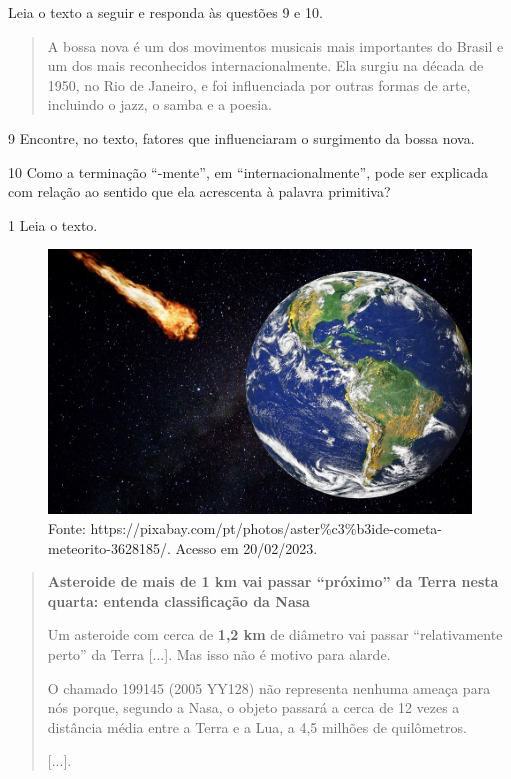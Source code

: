 
Leia o texto a seguir e responda às questões 9 e 10.

\begin{quote}
A bossa nova é um dos movimentos musicais mais importantes do Brasil e
um dos mais reconhecidos internacionalmente. Ela surgiu na década de
1950, no Rio de Janeiro, e foi influenciada por outras formas de arte,
incluindo o jazz, o samba e a poesia.
\end{quote}

\num{9} Encontre, no texto, fatores que influenciaram o surgimento da bossa nova.



\num{10} Como a terminação ``-mente'', em ``internacionalmente'', pode ser explicada com relação ao sentido que ela acrescenta à palavra primitiva?




\num{1} Leia o texto.

\begin{figure}[htpb!]
\includegraphics[width=.5\textwidth]{./imgs/img3.jpg}
\caption{Fonte: https://pixabay.com/pt/photos/aster\%c3\%b3ide-cometa-meteorito-3628185/. Acesso em 20/02/2023.}
\end{figure}

\begin{quote}
\textbf{Asteroide de mais de 1 km vai passar ``próximo'' da Terra nesta
quarta: entenda classificação da Nasa}

Um asteroide com cerca de \textbf{1,2 km} de diâmetro vai passar
``relativamente perto'' da Terra {[}...{]}. Mas
isso não é motivo para alarde.

O chamado 199145 (2005 YY128) não representa nenhuma ameaça para nós
porque, segundo a Nasa, o
objeto passará a cerca de 12 vezes a distância média entre a Terra e a
Lua, a 4,5 milhões de quilômetros.

{[}...{]}.

\end{quote}

